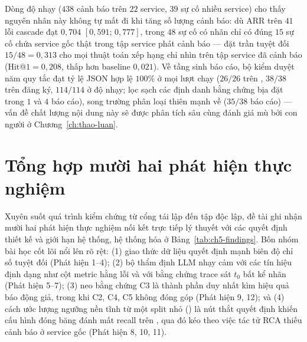 Dòng độ nhạy ($438$ cảnh báo trên $22$ service, $39$ sự cố nhiều service) cho thấy nguyên nhân này không tự mất đi khi tăng số lượng cảnh báo: dù ARR trên $41$ lỗi cascade đạt $0{,}704$ $[0{,}591;\, 0{,}777]$, trong $48$ sự cố có nhãn chỉ có đúng $15$ sự cố chứa service gốc thật trong tập service phát cảnh báo — đặt trần tuyệt đối $15/48 = 0{,}313$ cho mọi thuật toán xếp hạng chỉ nhìn trên tập service đã cảnh báo ($\text{Hit@1} = 0{,}208$, thấp hơn baseline $0{,}021$). Về tầng sinh báo cáo, bộ kiểm duyệt năm quy tắc đạt tỷ lệ JSON hợp lệ $100\%$ ở mọi lượt chạy ($26/26$ trên , $38/38$ trên  đăng ký, $114/114$ ở độ nhạy; lọc sạch các định danh bằng chứng bịa đặt trong $1$ và $4$ báo cáo), song trường phân loại  thiên mạnh về  ($35/38$ báo cáo) — vấn đề chất lượng nội dung này sẽ được phân tích sâu cùng đánh giá mù bởi con người ở Chương~\ref{ch:thao-luan}.

\section{Tổng hợp mười hai phát hiện thực nghiệm}
\label{sec:ch5-synthesis}

Xuyên suốt quá trình kiểm chứng từ cổng tái lập đến tập  độc lập, đề tài ghi nhận mười hai phát hiện thực nghiệm nối kết trực tiếp lý thuyết với các quyết định thiết kế và giới hạn hệ thống, hệ thống hóa ở Bảng~\ref{tab:ch5-findings}. Bốn nhóm bài học cốt lõi nổi lên rõ rệt: (1) giao thức dữ liệu quyết định mạnh biên độ chỉ số tuyệt đối (Phát hiện 1--4); (2) bộ thẩm định LLM nhạy cảm với các tín hiệu định dạng như cột metric hằng lỗi và với bằng chứng trace sát $t_0$ bất kể nhãn (Phát hiện 5--7); (3) neo bằng chứng C3 là thành phần duy nhất kìm hiệu quả báo động giả, trong khi C2, C4, C5 không đóng góp (Phát hiện 9, 12); và (4) cách ước lượng ngưỡng nền tĩnh từ một split nhỏ () là nút thắt quyết định khiến cấu hình đóng băng đánh mất recall trên , qua đó kéo theo việc tác tử RCA thiếu cảnh báo ở service gốc (Phát hiện 8, 10, 11).


